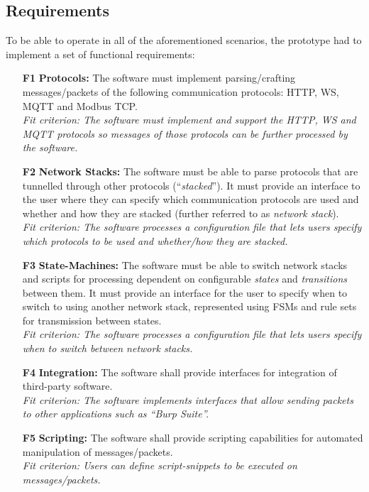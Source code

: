 \subsection{Requirements}
To be able to operate in all of the aforementioned scenarios, the prototype had to implement a set of functional requirements:
\begin{itemize}
    \item [\textbf{F1}] \textbf{Protocols:} The software must implement parsing/crafting messages/packets of the following communication protocols: \ac{HTTP}, \ac{WS}, \ac{MQTT} and Modbus \ac{TCP}. \\
          \textit{Fit criterion: The software must implement and support the \ac{HTTP}, \ac{WS} and \ac{MQTT} protocols so messages of those protocols can be further processed by the software.}
    \item [\textbf{F2}] \textbf{Network Stacks:} The software must be able to parse protocols that are tunnelled through other protocols (\enquote{\emph{stacked}}). It must provide an interface to the user where they can specify which communication protocols are used and whether and how they are stacked (further referred to as \emph{network stack}).\\
          \textit{Fit criterion: The software processes a configuration file that lets users specify which protocols to be used and whether/how they are stacked.}
    \item [\textbf{F3}] \textbf{State-Machines:} The software must be able to switch network stacks and scripts for processing dependent on configurable \emph{states} and \emph{transitions} between them. It must provide an interface for the user to specify when to switch to using another network stack, represented using \acp{FSM} and rule sets for transmission between states.\\
          \textit{Fit criterion: The software processes a configuration file that lets users specify when to switch between network stacks.}
    \item [\textbf{F4}] \textbf{Integration:} The software shall provide interfaces for integration of third-party software.\\
          \textit{Fit criterion: The software implements interfaces that allow sending packets to other applications such as \enquote{Burp Suite}.}
    \item [\textbf{F5}] \textbf{Scripting:} The software shall provide scripting capabilities for automated manipulation of messages/packets.\\
          \textit{Fit criterion: Users can define script-snippets to be executed on messages/packets.}
\end{itemize}

